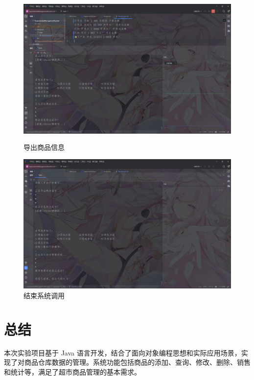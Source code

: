 \documentclass[12pt, a4paper, oneside]{ctexart}
\begin{document}
\begin{figure}[H]
    \begin{minipage}[t]{0.48\textwidth}
        \includegraphics[width=\textwidth]{images/导出商品信息.png}
        \caption*{导出商品信息}
    \end{minipage}
    \hfill
    \begin{minipage}[t]{0.48\textwidth}
        \includegraphics[width=\textwidth]{images/结束系统调用.png}
        \caption*{结束系统调用}
    \end{minipage}
\end{figure}

\section{总结}

\begin{flushleft}
本次实验项目基于 Java 语言开发，结合了面向对象编程思想和实际应用场景，实现了对商品仓库数据的管理。系统功能包括商品的添加、查询、修改、删除、销售和统计等，满足了超市商品管理的基本需求。
\end{flushleft}
\end{document}
